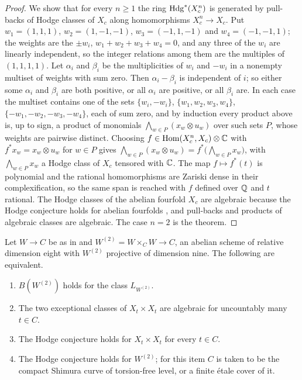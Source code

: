 \begin{proof}
We show that for every $n\ge1$ the ring $\mathrm{Hdg}^{*}(X_{c}^{n})$ is generated by
pull-backs of Hodge classes of $X_{c}$ along homomorphisms $X_{c}^{n}\to
X_{c}$. Put $w_{1}=(1,1,1)$, $w_{2}=(1,-1,-1)$, $w_{3}=(-1,1,-1)$ and
$w_{4}=(-1,-1,1)$; the weights are the $\pm w_{i}$,
$w_{1}+w_{2}+w_{3}+w_{4}=0$, and any three of the $w_{i}$ are linearly
independent, so the integer relations among them are the multiples of
$(1,1,1,1)$. Let $\alpha_{i}$ and $\beta_{i}$ be the multiplicities of $w_{i}$
and $-w_{i}$ in a nonempty multiset of weights with sum zero. Then
$\alpha_{i}-\beta_{i}$ is independent of $i$; so either some $\alpha_{i}$ and
$\beta_{i}$ are both positive, or all $\alpha_{i}$ are positive, or all
$\beta_{i}$ are. In each case the multiset contains one of the sets
$\{w_{i},-w_{i}\}$, $\{w_{1},w_{2},w_{3},w_{4}\}$,
$\{-w_{1},-w_{2},-w_{3},-w_{4}\}$, each of sum zero, and by induction every
product above is, up to sign, a product of monomials
$\bigwedge_{w\in P}(x_{w}\otimes u_{w})$ over such sets $P$, whose weights are
pairwise distinct. Choosing $f\in\operatorname{Hom}(X_{c}^{n},X_{c})\otimes\mathbb{C}$ with
$f^{*}x_{w}=x_{w}\otimes u_{w}$ for $w\in P$ gives
$\bigwedge_{w\in P}(x_{w}\otimes u_{w})=f^{*}\bigl(\bigwedge_{w\in P}x_{w}\bigr)$,
with $\bigwedge_{w\in P}x_{w}$ a Hodge class of $X_{c}$ tensored with $\mathbb{C}$.
The map $f\mapsto f^{*}(t)$ is polynomial and the rational homomorphisms are
Zariski dense in their complexification, so the same span is reached with $f$
defined over $\mathbb{Q}$ and $t$ rational. The Hodge classes of the abelian fourfold
$X_{c}$ are algebraic because the Hodge conjecture holds for abelian fourfolds
\cite{Mar25a}, and pull-backs and products of algebraic classes are
algebraic. The case $n=2$ is the theorem.
\end{proof}

\begin{corollary}\label{cor:mumfordequiv}
Let $W\to C$ be as in  and
$W^{(2)}=W\times_{C}W\to C$, an abelian scheme of relative dimension eight
with $W^{(2)}$ projective of dimension nine. The following are equivalent.
\begin{enumerate}[label=\textup{(\alph*)},leftmargin=2.6em,itemsep=2pt]
\item $B(W^{(2)})$ holds for the class $L_{W^{(2)}}$.
\item The two exceptional classes of $X_{t}\times X_{t}$ are algebraic for
  uncountably many $t\in C$.
\item The Hodge conjecture holds for $X_{t}\times X_{t}$ for every $t\in C$.
\item The Hodge conjecture holds for $W^{(2)}$; for this item $C$ is taken to
  be the compact Shimura curve of torsion-free level, or a finite \'etale
  cover of it.
\end{enumerate}
\end{corollary}

